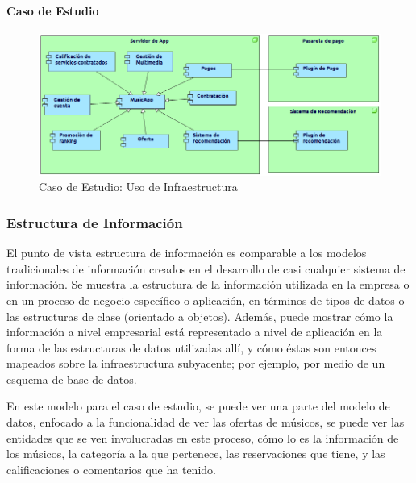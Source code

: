\paragraph{Caso de Estudio}

\begin{figure}[h!]
	\centering
	\includegraphics[width=\linewidth]{Desarrollo/ArquitecturaEmpresarial/Tecnologia/imgs/uso2.png}
	\caption{Caso de Estudio: Uso de Infraestructura}
\end{figure}

\newpage

\subsubsection{Estructura de Información}
El punto de vista estructura de información es comparable a los modelos tradicionales de información creados en el desarrollo de casi cualquier sistema de información. Se muestra la estructura de la información utilizada en la empresa o en un proceso de negocio específico o aplicación, en términos de tipos de datos o las estructuras de clase (orientado a objetos). Además, puede mostrar cómo la información a nivel empresarial está representado a nivel de aplicación en la forma de las estructuras de datos utilizadas allí, y cómo éstas son entonces mapeados sobre la infraestructura subyacente; por ejemplo, por medio de un esquema de base de datos.  \vspace{\baselineskip}

En este modelo para el caso de estudio, se puede ver una parte del modelo de datos, enfocado a la funcionalidad de ver las ofertas de músicos, se puede ver las entidades que se ven involucradas en este proceso, cómo lo es la información de los músicos, la categoría a la que pertenece, las reservaciones que tiene, y las calificaciones o comentarios que ha tenido.


